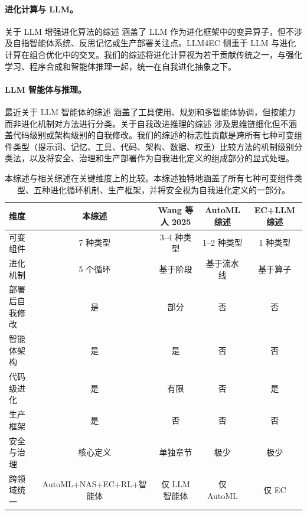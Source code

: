 \paragraph{进化计算与 LLM。} 关于 LLM 增强进化算法的综述 \cite{yang2024large,liu2024large} 涵盖了 LLM 作为进化框架中的变异算子，但不涉及自指智能体系统、反思记忆或生产部署关注点。LLM4EC \cite{wuxingyu2025llm4ec} 侧重于 LLM 与进化计算在组合优化中的交叉。我们的综述将进化计算视为若干贡献传统之一，与强化学习、程序合成和智能体推理一起，统一在自我进化抽象之下。

\paragraph{LLM 智能体与推理。} 最近关于 LLM 智能体的综述 \cite{xi2025riseagent,wang2024surveyagent} 涵盖了工具使用、规划和多智能体协调，但按能力而非进化机制对方法进行分类。关于自我改进推理的综述 \cite{huang2025selfimprove} 涉及思维链细化但不涵盖代码级别或架构级别的自我修改。我们的综述的标志性贡献是跨所有七种可变组件类型（提示词、记忆、工具、代码、架构、数据、权重）比较方法的机制级别分类法，以及将安全、治理和生产部署作为自我进化定义的组成部分的显式处理。

\begin{table}[t]
\centering
{\TableTight
\begin{tabularx}{\textwidth}{@{}L{0.22\textwidth}cccc@{}}
\toprule
\textbf{维度} & \textbf{本综述} & \textbf{Wang 等人 2025} & \textbf{AutoML 综述} & \textbf{EC+LLM 综述} \\
\midrule
可变组件 & 7 种类型 & 3--4 种类型 & 1--2 种类型 & 1 种类型 \\
进化机制 & 5 个循环 & 基于阶段 & 基于流水线 & 基于算子 \\
部署后自我修改 & 是 & 部分 & 否 & 否 \\
智能体架构 & 是 & 是 & 否 & 否 \\
代码级进化 & 是 & 有限 & 否 & 是 \\
生产框架 & 是 & 否 & 否 & 否 \\
安全与治理 & 核心定义 & 单独章节 & 极少 & 极少 \\
跨领域统一 & AutoML+NAS+EC+RL+智能体 & 仅 LLM 智能体 & 仅 AutoML & 仅 EC \\
\bottomrule
\end{tabularx}}
\caption{本综述与相关综述在关键维度上的比较。本综述独特地涵盖了所有七种可变组件类型、五种进化循环机制、生产框架，并将安全视为自我进化定义的一部分。}
\label{tab:survey-comparison}
\end{table}

